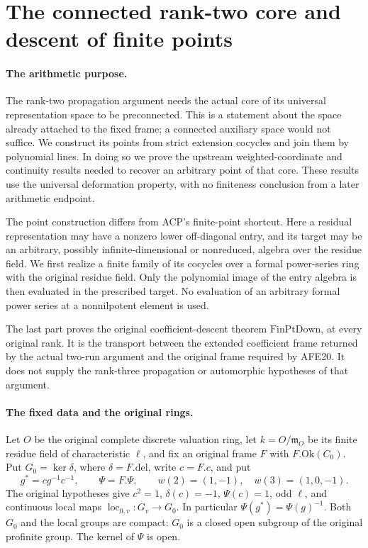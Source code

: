 \section{The connected rank-two core and descent of finite points}
\label{sec:rank-two-connectedness}

\paragraph{The arithmetic purpose.}
The rank-two propagation argument needs the actual core of its universal
representation space to be preconnected.  This is a statement about
the space already attached to the fixed frame; a connected auxiliary
space would not suffice.  We construct its points from strict extension
cocycles and join them by polynomial lines.  In doing so we prove the
upstream weighted-coordinate and continuity results needed to recover
an arbitrary point of that core.  These results use the universal
deformation property, with no finiteness conclusion from a later
arithmetic endpoint.

The point construction differs from ACP's finite-point shortcut.
Here a residual representation may have a nonzero lower off-diagonal
entry, and its target may be an arbitrary, possibly infinite-dimensional
or nonreduced, algebra over the residue field.  We first realize a
finite family of its cocycles over a formal power-series ring with the
original residue field.  Only the polynomial image of the entry algebra
is then evaluated in the prescribed target.  No evaluation of an
arbitrary formal power series at a nonnilpotent element is used.

The last part proves the original coefficient-descent theorem
\(\mathrm{FinPtDown}\), at every original rank.  It is the transport
between the extended coefficient frame returned by the actual two-run
argument and the original frame required by AFE20.  It does not supply
the rank-three propagation or automorphic hypotheses of that argument.

\paragraph{The fixed data and the original rings.}
Let \(O\) be the original complete discrete valuation ring, let
\(k=O/\mathfrak m_O\) be its finite residue field of characteristic
\(\ell\), and fix an original frame \(F\) with
\(F.\mathrm{Ok}(C_0)\).  Put \(G_0=\ker\delta\), where
\(\delta=F.\mathrm{del}\), write \(c=F.c\), and put
\[
 g^*=cg^{-1}c^{-1},\qquad \Psi=F.\Psi,
 \qquad w(2)=(1,-1),\quad w(3)=(1,0,-1).
                                                        \tag{RTC.1}
\]
The original hypotheses give \(c^2=1\), \(\delta(c)=-1\),
\(\Psi(c)=1\), odd \(\ell\), and continuous local maps
\(\operatorname{loc}_{0,v}:G_v\to G_0\).  In particular
\(\Psi(g^*)=\Psi(g)^{-1}\).  Both \(G_0\) and the local groups
are compact: \(G_0\) is a closed open subgroup of the original
profinite group.  The kernel of \(\Psi\) is open.

